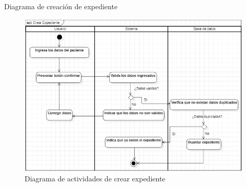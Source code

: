 \documentclass[12pt,letterpaper]{article}
\begin{document}
    \newpage
    Diagrama de creación de expediente
    \begin{figure}[H]
        \centering
        \includegraphics [scale=0.7]{actividades/crearExpediente}
        \caption{Diagrama de actividades de crear expediente}
    \end{figure}
\end{document}
